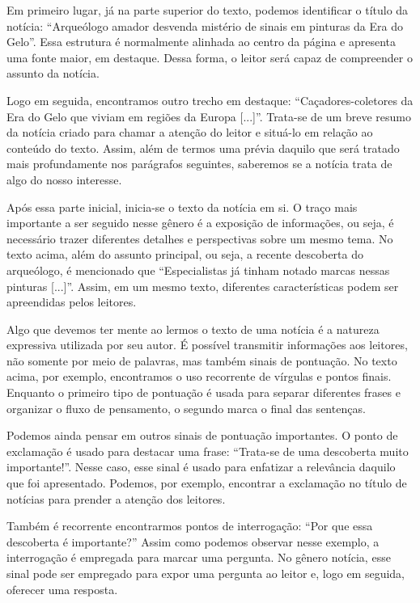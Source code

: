 {Em primeiro lugar, já na parte superior do texto, podemos identificar o
título da notícia: ``Arqueólogo amador desvenda mistério de sinais em
pinturas da Era do Gelo''. Essa estrutura é normalmente alinhada ao
centro da página e apresenta uma fonte maior, em destaque. Dessa forma,
o leitor será capaz de compreender o assunto da notícia.

Logo em seguida, encontramos outro trecho em destaque:
``Caçadores-coletores da Era do Gelo que viviam em regiões da Europa
{[}...{]}''. Trata-se de um breve resumo da notícia criado para chamar a
atenção do leitor e situá-lo em relação ao conteúdo do texto. Assim,
além de termos uma prévia daquilo que será tratado mais profundamente
nos parágrafos seguintes, saberemos se a notícia trata de algo do nosso
interesse.

Após essa parte inicial, inicia-se o texto da notícia em si. O traço
mais importante a ser seguido nesse gênero é a exposição de informações,
ou seja, é necessário trazer diferentes detalhes e perspectivas sobre um
mesmo tema. No texto acima, além do assunto principal, ou seja, a
recente descoberta do arqueólogo, é mencionado que ``Especialistas já
tinham notado marcas nessas pinturas {[}...{]}''. Assim, em um mesmo
texto, diferentes características podem ser apreendidas pelos leitores.

Algo que devemos ter mente ao lermos o texto de uma notícia é a natureza
expressiva utilizada por seu autor. É possível transmitir informações
aos leitores, não somente por meio de palavras, mas também sinais de
pontuação. No texto acima, por exemplo, encontramos o uso recorrente de
vírgulas e pontos finais. Enquanto o primeiro tipo de pontuação é usada
para separar diferentes frases e organizar o fluxo de pensamento, o
segundo marca o final das sentenças.

Podemos ainda pensar em outros sinais de pontuação importantes. O ponto
de exclamação é usado para destacar uma frase: ``Trata-se de uma
descoberta muito importante!''. Nesse caso, esse sinal é usado para
enfatizar a relevância daquilo que foi apresentado. Podemos, por
exemplo, encontrar a exclamação no título de notícias para prender a
atenção dos leitores.

Também é recorrente encontrarmos pontos de interrogação: ``Por que essa
descoberta é importante?'' Assim como podemos observar nesse exemplo, a
interrogação é empregada para marcar uma pergunta. No gênero notícia,
esse sinal pode ser empregado para expor uma pergunta ao leitor e, logo
em seguida, oferecer uma resposta.}

